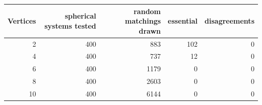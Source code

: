 \begin{tabular}{@{}rrrrr@{}}
\toprule
Vertices & spherical systems tested & random matchings drawn & essential & disagreements \\
\midrule
2 & 400 & 883 & 102 & 0 \\
4 & 400 & 737 & 12 & 0 \\
6 & 400 & 1179 & 0 & 0 \\
8 & 400 & 2603 & 0 & 0 \\
10 & 400 & 6144 & 0 & 0 \\
\bottomrule
\end{tabular}
